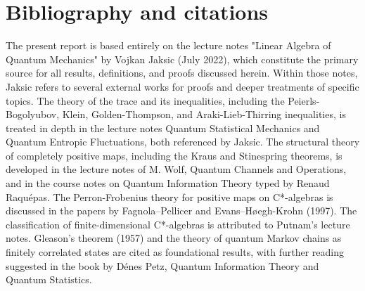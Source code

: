 \documentclass[11pt,a4paper]{article}
\begin{document}
\section{Bibliography and citations}
The present report is based entirely on the lecture notes "Linear Algebra of Quantum Mechanics" by Vojkan Jaksic (July 2022), which constitute the primary source for all results, definitions, and proofs discussed herein. Within those notes, Jaksic refers to several external works for proofs and deeper treatments of specific topics. The theory of the trace and its inequalities, including the Peierls-Bogolyubov, Klein, Golden-Thompson, and Araki-Lieb-Thirring inequalities, is treated in depth in the lecture notes Quantum Statistical Mechanics and Quantum Entropic Fluctuations, both referenced by Jaksic. The structural theory of completely positive maps, including the Kraus and Stinespring theorems, is developed in the lecture notes of M. Wolf, Quantum Channels and Operations, and in the course notes on Quantum Information Theory typed by Renaud Raquépas. The Perron-Frobenius theory for positive maps on C*-algebras is discussed in the papers by Fagnola–Pellicer and Evans–Høegh-Krohn (1997). The classification of finite-dimensional C*-algebras is attributed to Putnam's lecture notes. Gleason's theorem (1957) and the theory of quantum Markov chains as finitely correlated states are cited as foundational results, with further reading suggested in the book by Dénes Petz, Quantum Information Theory and Quantum Statistics.

\end{document}
